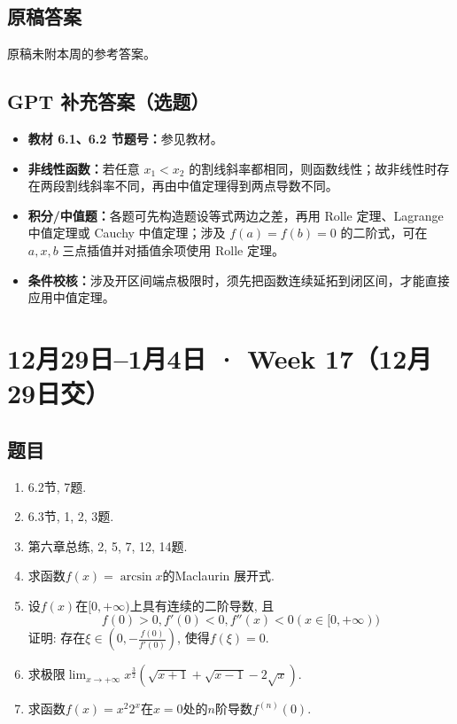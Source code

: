 \documentclass[UTF8,11pt, a4paper, oneside, fontset=none]{ctexbook}
\begin{document}
\subsection*{原稿答案}
\noindent 原稿未附本周的参考答案。
\clearpage
\subsection*{GPT 补充答案（选题）}
\begin{itemize}
\item \textbf{教材 6.1、6.2 节题号：}参见教材。
\item \textbf{非线性函数：}若任意 $x_1<x_2$ 的割线斜率都相同，则函数线性；故非线性时存在两段割线斜率不同，再由中值定理得到两点导数不同。
\item \textbf{积分/中值题：}各题可先构造题设等式两边之差，再用 Rolle 定理、Lagrange 中值定理或 Cauchy 中值定理；涉及 $f(a)=f(b)=0$ 的二阶式，可在 $a,x,b$ 三点插值并对插值余项使用 Rolle 定理。
\item \textbf{条件校核：}涉及开区间端点极限时，须先把函数连续延拓到闭区间，才能直接应用中值定理。
\end{itemize}
\clearpage
\section{12月29日--1月4日 · Week 17（12月29日交）}
\subsection*{题目}
\begin{enumerate}

\item 6.2节, 7题.

\item 6.3节, 1, 2, 3题.

\item 第六章总练, 2, 5, 7, 12, 14题.

\item 求函数$f(x) = \arcsin x$的Maclaurin 展开式.

\item 设$f(x)$在$[0, + \infty)$上具有连续的二阶导数, 且
\[
f(0) >0, f'(0) <0, f''(x) < 0 (x \in [0, + \infty))
\]
证明: 存在$\xi \in \left( 0, - \frac{f(0)}{f'(0)}\right)$, 使得$f(\xi ) = 0$.

\item 求极限$\lim_{x \to +\infty} x^{\frac{3}{2}} (\sqrt{x+1} + \sqrt{x-1} - 2 \sqrt x)$.

\item 求函数$f(x) = x^2 2^x$在$x = 0$处的$n$阶导数$f^{(n)}(0)$.

\end{enumerate}
\clearpage
\end{document}

